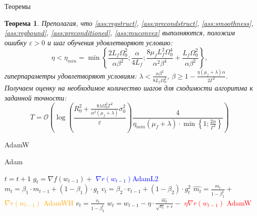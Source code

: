 \documentclass[aspectratio=169, 12pt]{beamer}
\newtheorem{theorem_rus}{Теорема}
\begin{document}
\begin{frame}{Теоремы}
    \begin{theorem_rus}
    Преполагая, что \ref{ass:regstruct}, \ref{ass:precondstruct}, \ref{ass:smoothness}, \ref{ass:regbound}, \ref{ass:preconditioned}, \ref{ass:muconvex} выполняются, положим ошибку $\varepsilon > 0$ и шаг обучения удовлетворяют условию: 
    $$
    \eta < \eta_{min} = \min \left\{ \frac{2L_f \Omega_0^2}{\alpha \beta^2}; \frac{\alpha}{4L_f}; \frac{8\mu_f L_f^2 \Omega_0^4}{\alpha^2 \beta^4} + \frac{L_f \Omega_0^2}{\alpha \beta^2} \right\},
    $$ гиперпараметры удовлетворяют условиям: $\lambda < \frac{\alpha \beta^2}{8L_f \Omega_0^2}$, $\beta \geq 1 - \frac{\eta(\mu_f + \lambda)\alpha}{2 \Gamma^2}$. Получаем оценку на необходимое количество шагов для сходимости алгоритма к заданной точности:
    $$T = \mathcal{O} \left(\log\left(\frac{R_0^2 + \frac{8\lambda \Omega_0^2 \Gamma^2}{\alpha^2(\mu_f+\lambda)} \sigma_0^2}{\varepsilon} \right) \frac{4}{\eta_{min} (\mu_f + \lambda)\cdot \min \left\{1; \frac{2\alpha}{\Gamma^2} \right\} } \right)$$
\end{theorem_rus}
\end{frame}

\begin{frame}{AdamW}
    \begin{algorithm}[H]
            \caption{Adam}\label{alg:genAdam}    
            \begin{algorithmic}
            \small{
            \State $t = t+1$
            \State $g_t = \nabla f(w_{t-1}) + $ \textcolor{blue}{$\nabla r(w_{t-1})$}\hfill \textcolor{blue}{AdamL2}
            \State $m_t = \beta_1 \cdot m_{t-1} + (1 - \beta_1) \cdot g_t$
            \State $v_t = \beta_2 \cdot v_{t-1} + (1 - \beta_2) \cdot g_t^2$
            \State $\hat{m_t} = \frac{m_t}{1-\beta_1^t} +$ \textcolor{orange}{$\nabla r(w_{t-1})$} \hfill \textcolor{orange}{AdamWH}
            \State $\hat{v_t} = \frac{v_t}{1-\beta_2^t}$ 
            \State $w_t = w_{t-1} - \eta \cdot \frac{\hat{m_t}}{\sqrt{v_t} + \epsilon} - $ \textcolor{red}{$\eta \nabla r(w_{t-1})$ } \hfill \textcolor{red}{AdamW}
            \EndWhile
            }
\end{algorithmic}
\end{algorithm}
\end{frame}
\end{document}
